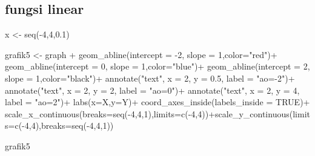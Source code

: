 \documentclass[
  letterpaper,
  DIV=11,
  numbers=noendperiod]{scrartcl}
\newenvironment{Shaded}{\begin{snugshade}}{\end{snugshade}}
\newcommand{\AttributeTok}[1]{\textcolor[rgb]{0.40,0.45,0.13}{#1}}
\newcommand{\ConstantTok}[1]{\textcolor[rgb]{0.56,0.35,0.01}{#1}}
\newcommand{\DecValTok}[1]{\textcolor[rgb]{0.68,0.00,0.00}{#1}}
\newcommand{\FloatTok}[1]{\textcolor[rgb]{0.68,0.00,0.00}{#1}}
\newcommand{\FunctionTok}[1]{\textcolor[rgb]{0.28,0.35,0.67}{#1}}
\newcommand{\NormalTok}[1]{\textcolor[rgb]{0.00,0.23,0.31}{#1}}
\newcommand{\OtherTok}[1]{\textcolor[rgb]{0.00,0.23,0.31}{#1}}
\newcommand{\SpecialCharTok}[1]{\textcolor[rgb]{0.37,0.37,0.37}{#1}}
\newcommand{\StringTok}[1]{\textcolor[rgb]{0.13,0.47,0.30}{#1}}
\begin{document}
\subsection{fungsi linear}\label{fungsi-linear-2}

\begin{Shaded}
\begin{Highlighting}[]
\NormalTok{x }\OtherTok{\textless{}{-}} \FunctionTok{seq}\NormalTok{(}\SpecialCharTok{{-}}\DecValTok{4}\NormalTok{,}\DecValTok{4}\NormalTok{,}\FloatTok{0.1}\NormalTok{)}

\NormalTok{grafik5 }\OtherTok{\textless{}{-}}\NormalTok{ graph }\SpecialCharTok{+}
  \FunctionTok{geom\_abline}\NormalTok{(}\AttributeTok{intercept =} \SpecialCharTok{{-}}\DecValTok{2}\NormalTok{, }\AttributeTok{slope =} \DecValTok{1}\NormalTok{,}\AttributeTok{color=}\StringTok{"red"}\NormalTok{)}\SpecialCharTok{+}
  \FunctionTok{geom\_abline}\NormalTok{(}\AttributeTok{intercept =} \DecValTok{0}\NormalTok{, }\AttributeTok{slope =} \DecValTok{1}\NormalTok{,}\AttributeTok{color=}\StringTok{"blue"}\NormalTok{)}\SpecialCharTok{+}
  \FunctionTok{geom\_abline}\NormalTok{(}\AttributeTok{intercept =} \DecValTok{2}\NormalTok{, }\AttributeTok{slope =} \DecValTok{1}\NormalTok{,}\AttributeTok{color=}\StringTok{"black"}\NormalTok{)}\SpecialCharTok{+}
  \FunctionTok{annotate}\NormalTok{(}\StringTok{"text"}\NormalTok{, }\AttributeTok{x =} \DecValTok{2}\NormalTok{, }\AttributeTok{y =} \FloatTok{0.5}\NormalTok{, }\AttributeTok{label =} \StringTok{"ao={-}2"}\NormalTok{)}\SpecialCharTok{+}
  \FunctionTok{annotate}\NormalTok{(}\StringTok{"text"}\NormalTok{, }\AttributeTok{x =} \DecValTok{2}\NormalTok{, }\AttributeTok{y =} \DecValTok{2}\NormalTok{, }\AttributeTok{label =} \StringTok{"ao=0"}\NormalTok{)}\SpecialCharTok{+}
  \FunctionTok{annotate}\NormalTok{(}\StringTok{"text"}\NormalTok{, }\AttributeTok{x =} \DecValTok{2}\NormalTok{, }\AttributeTok{y =} \DecValTok{4}\NormalTok{, }\AttributeTok{label =} \StringTok{"ao=2"}\NormalTok{)}\SpecialCharTok{+}
  \FunctionTok{labs}\NormalTok{(}\AttributeTok{x=}\StringTok{\textquotesingle{}X\textquotesingle{}}\NormalTok{,}\AttributeTok{y=}\StringTok{\textquotesingle{}Y\textquotesingle{}}\NormalTok{)}\SpecialCharTok{+}
  \FunctionTok{coord\_axes\_inside}\NormalTok{(}\AttributeTok{labels\_inside =} \ConstantTok{TRUE}\NormalTok{)}\SpecialCharTok{+}
  \FunctionTok{scale\_x\_continuous}\NormalTok{(}\AttributeTok{breaks=}\FunctionTok{seq}\NormalTok{(}\SpecialCharTok{{-}}\DecValTok{4}\NormalTok{,}\DecValTok{4}\NormalTok{,}\DecValTok{1}\NormalTok{),}\AttributeTok{limits=}\FunctionTok{c}\NormalTok{(}\SpecialCharTok{{-}}\DecValTok{4}\NormalTok{,}\DecValTok{4}\NormalTok{))}\SpecialCharTok{+}\FunctionTok{scale\_y\_continuous}\NormalTok{(}\AttributeTok{limits=}\FunctionTok{c}\NormalTok{(}\SpecialCharTok{{-}}\DecValTok{4}\NormalTok{,}\DecValTok{4}\NormalTok{),}\AttributeTok{breaks=}\FunctionTok{seq}\NormalTok{(}\SpecialCharTok{{-}}\DecValTok{4}\NormalTok{,}\DecValTok{4}\NormalTok{,}\DecValTok{1}\NormalTok{))}

\NormalTok{grafik5}
\end{Highlighting}
\end{Shaded}
\end{document}
